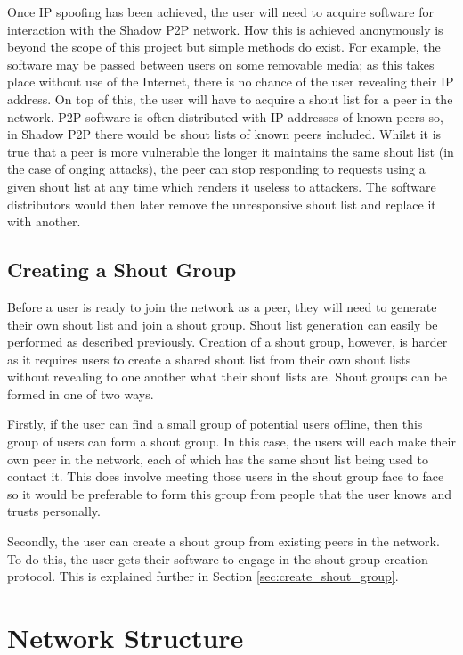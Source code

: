 \documentclass[ %
                    author={Luke Murray},
                supervisor={Dr. Simon Hollis},
                     title={Shadow Peer-to-Peer Networks},
                  subtitle={},
                    degree={MEng},
                      year={2013} ]{thesis}
\begin{document}

Once IP spoofing has been achieved, the user will need to acquire software for interaction with the Shadow P2P network. How this is achieved anonymously is beyond the scope of this project but simple methods do exist. For example, the software may be passed between users on some removable media; as this takes place without use of the Internet, there is no chance of the user revealing their IP address. On top of this, the user will have to acquire a shout list for a peer in the network. P2P software is often distributed with IP addresses of known peers so, in Shadow P2P there would be shout lists of known peers included. Whilst it is true that a peer is more vulnerable the longer it maintains the same shout list (in the case of onging attacks), the peer can stop responding to requests using a given shout list at any time which renders it useless to attackers. The software distributors would then later remove the unresponsive shout list and replace it with another. 

\subsection{Creating a Shout Group}

Before a user is ready to join the network as a peer, they will need to generate their own shout list and join a shout group. Shout list generation can easily be performed as described previously. Creation of a shout group, however, is harder as it requires users to create a shared shout list from their own shout lists without revealing to one another what their shout lists are. Shout groups can be formed in one of two ways.

Firstly, if the user can find a small group of potential users offline, then this group of users can form a shout group. In this case, the users will each make their own peer in the network, each of which has the same shout list being used to contact it. This does involve meeting those users in the shout group face to face so it would be preferable to form this group from people that the user knows and trusts personally.

Secondly, the user can create a shout group from existing peers in the network. To do this, the user gets their software to engage in the shout group creation protocol. This is explained further in Section \ref{sec:create_shout_group}.

\section{Network Structure}
\end{document}
